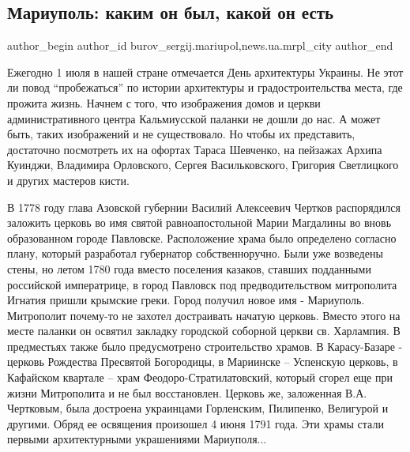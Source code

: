  
 
 
 
 
 
\subsection{Мариуполь: каким он был, какой он есть}
\label{sec:01_07_2017.stz.news.ua.mrpl_city.1.mariupol_kakim_on_byl_kakoj_on_est}
 
\ifcmt
 author_begin
   author_id burov_sergij.mariupol,news.ua.mrpl_city
 author_end
\fi


Ежегодно 1 июля в нашей стране отмечается День архитектуры Украины. Не этот ли
повод \enquote{пробежаться} по истории архитектуры и градостроительства места, где
прожита жизнь. Начнем с того, что изображения домов и церкви административного
центра Кальмиусской паланки не дошли до нас. А может быть, таких изображений и
не существовало. Но чтобы их представить, достаточно посмотреть их на офортах
Тараса Шевченко, на пейзажах Архипа Куинджи, Владимира Орловского, Сергея
Васильковского, Григория Светлицкого и других мастеров кисти.


В 1778 году глава Азовской губернии Василий Алексеевич Чертков распорядился
заложить церковь во имя святой равноапостольной Марии Магдалины во вновь
образованном городе Павловске. Расположение храма было определено согласно
плану, который разработал губернатор собственноручно. Были уже возведены стены,
но летом 1780 года вместо поселения казаков, ставших подданными российской
императрице, в город Павловск под предводительством митрополита Игнатия пришли
крымские греки. Город получил новое имя - Мариуполь. Митрополит почему-то не
захотел достраивать начатую церковь. Вместо этого на месте паланки он освятил
закладку городской соборной церкви св. Харлампия. В предместьях также было
предусмотрено строительство храмов. В Карасу-Базаре - церковь Рождества
Пресвятой Богородицы, в Мариинске – Успенскую церковь, в Кафайском квартале –
храм Феодоро-Стратилатовский, который сгорел еще при жизни Митрополита и не был
восстановлен. Церковь же, заложенная В.А. Чертковым, была достроена украинцами
Горленским, Пилипенко, Велигурой и другими. Обряд ее освящения произошел 4 июня
1791 года. Эти храмы стали первыми архитектурными украшениями Мариуполя...

